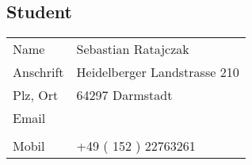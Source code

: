 \subsection{Student
}\label{subsec:student}

\begin{tabularx}{0.95\textwidth}{l X}
    Name            & Sebastian Ratajczak
    \\
    Anschrift       & Heidelberger Landstrasse 210
    \\
    Plz, Ort        & 64297 Darmstadt
    \\
    Email   & \sitHref[sebastian.ratajczak@stud.h-da.de]{%
              mailto:sebastian.ratajczak@stud.h-da.de}
    \\ %
            & \sitHref[s.ratajczak@iot-venture.com]{%
              mailto:s.ratajczak@iot-venture.com}
    \\
    Mobil   & +49 ( 152 ) 22763261
\end{tabularx}

